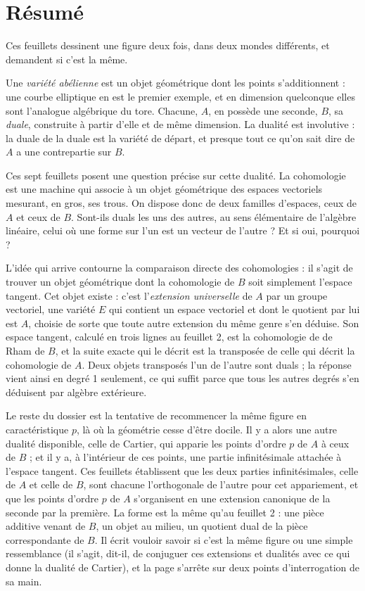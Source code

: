 \documentclass[11pt,a4paper]{article}
\begin{document}
\section*{Résumé}

\begin{resume}
Ces feuillets dessinent une figure deux fois, dans deux mondes différents, et
demandent si c'est la même.

Une \emph{variété abélienne} est un objet géométrique dont les points
s'additionnent : une courbe elliptique en est le premier exemple, et en
dimension quelconque elles sont l'analogue algébrique du tore. Chacune,
$A$, en possède une seconde, $B$, sa \emph{duale}, construite à partir d'elle
et de même dimension. La dualité est involutive : la
duale de la duale est la variété de départ, et presque tout ce qu'on sait dire
de $A$ a une contrepartie sur $B$.

Ces sept feuillets posent une question précise sur cette dualité. La
cohomologie est une machine qui associe à un objet géométrique des espaces
vectoriels mesurant, en gros, ses trous. On dispose donc de deux familles
d'espaces, ceux de $A$ et ceux de $B$. Sont-ils duals les uns des autres, au
sens élémentaire de l'algèbre linéaire, celui où une forme sur l'un est un
vecteur de l'autre ? Et si oui, pourquoi ?

L'idée qui arrive contourne la comparaison directe des cohomologies : il s'agit de
trouver un objet géométrique dont la cohomologie de $B$ soit simplement
l'espace tangent. Cet objet existe : c'est l'\emph{extension universelle} de
$A$ par un groupe vectoriel, une variété $E$ qui contient un espace vectoriel
et dont le quotient par lui est $A$, choisie de sorte que toute autre
extension du même genre s'en déduise. Son espace tangent, calculé en trois
lignes au feuillet 2, est la cohomologie de de Rham de $B$, et la suite exacte
qui le décrit est la transposée de celle qui décrit la cohomologie de $A$.
Deux objets transposés l'un de l'autre sont duals ; la réponse vient ainsi en
degré 1 seulement, ce qui suffit parce que tous les autres degrés
s'en déduisent par algèbre extérieure.

Le reste du dossier est la tentative de recommencer la même figure en
caractéristique $p$, là où la géométrie cesse d'être docile. Il y a alors une
autre dualité disponible, celle de Cartier, qui apparie les points d'ordre $p$
de $A$ à ceux de $B$ ; et il y a, à l'intérieur de ces points, une partie
infinitésimale attachée à l'espace tangent. Ces feuillets établissent
que les deux parties infinitésimales, celle de $A$ et celle de $B$, sont
chacune l'orthogonale de l'autre pour cet appariement, et que les points
d'ordre $p$ de $A$ s'organisent en une extension canonique de la seconde par la
première. La forme est la même qu'au feuillet 2 : une pièce additive venant de
$B$, un objet au milieu, un quotient dual de la pièce correspondante de $B$.
Il écrit vouloir savoir si c'est la même figure ou une simple ressemblance
(il s'agit, dit-il, de conjuguer ces extensions et dualités avec ce qui donne
la dualité de Cartier), et la page s'arrête sur deux points d'interrogation de
sa main.


\end{resume}
\end{document}
